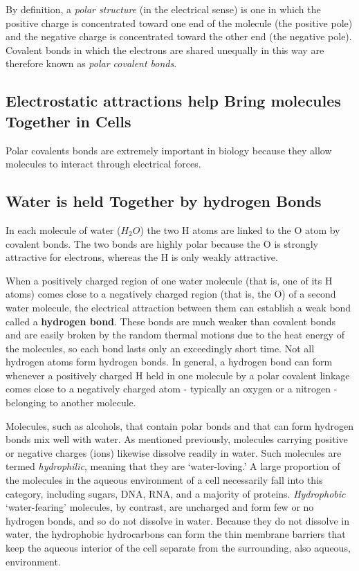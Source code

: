 By definition, a \textit{polar structure} (in the electrical sense) is one in which the
positive charge is concentrated toward
one end of the molecule (the positive pole) and the negative charge is
concentrated toward the other end (the negative pole). Covalent bonds
in which the electrons are shared unequally in this way are therefore
known as \textit{polar covalent bonds}.

\subsection{Electrostatic attractions help Bring molecules Together in Cells}

Polar covalents bonds are extremely important in biology because they allow
molecules to interact through electrical forces.

\subsection{Water is held Together by hydrogen Bonds}

In each molecule of water ($H_{2}O$) the two H atoms are linked to the O
atom by covalent bonds. The two bonds are highly polar because the O is
strongly attractive for electrons, whereas the H is only weakly attractive.

When a positively charged
region of one water molecule (that is, one of its H atoms) comes close to
a negatively charged region (that is, the O) of a second water molecule,
the electrical attraction between them can establish a weak bond called a
\textbf{hydrogen bond}. These bonds are much weaker than covalent bonds and
are easily broken by the random thermal motions due to the heat energy
of the molecules, so each bond lasts only an exceedingly short time.
Not all hydrogen atoms form hydrogen bonds. In general, a hydrogen
bond can form whenever a positively charged H held in one molecule by
a polar covalent linkage comes close to a negatively charged atom - typically
an oxygen or a nitrogen - belonging to another molecule.

Molecules, such as alcohols, that contain polar bonds and that can form
hydrogen bonds mix well with water. As mentioned previously, molecules
carrying positive or negative charges (ions) likewise dissolve
readily in water. Such molecules are termed \textit{hydrophilic}, meaning that
they are ‘water-loving.’ A large proportion of the molecules in the aqueous
environment of a cell necessarily fall into this category, including
sugars, DNA, RNA, and a majority of proteins. \textit{Hydrophobic} ‘water-fearing’
molecules, by contrast, are uncharged and form few or no hydrogen
bonds, and so do not dissolve in water.
Because they do not dissolve in water, the hydrophobic hydrocarbons can form
the thin membrane barriers that keep the aqueous interior of the cell
separate from the surrounding, also aqueous, environment.

